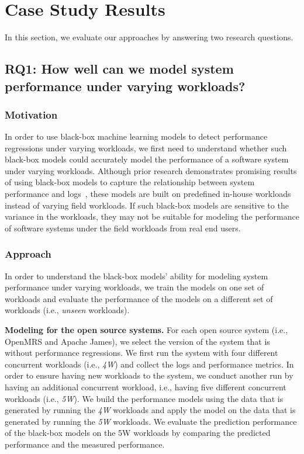 \section{Case Study Results} \label{sec:casestudyresults}
In this section, we evaluate our approaches by answering two research questions.

\subsection*{RQ1: How well can we model system performance under varying workloads?}

\subsubsection*{Motivation}
In order to use black-box machine learning models to detect performance regressions under varying workloads, we first need to understand whether such black-box models could accurately model the performance of a software system under varying workloads.
Although prior research demonstrates promising results of using black-box models to capture the relationship between system performance and logs~\citep{Yao:2018:LSL:3184407.3184416,DBLP:conf/issre/FarshchiSWG15},
these models are built on predefined in-house workloads instead of varying field workloads. 
If such black-box models are sensitive to the variance in the workloads, they may not be suitable for modeling the performance of software systems under the field workloads from real end users.

\subsubsection*{Approach}
In order to understand the black-box models' ability for modeling system performance under varying workloads, we train the models on one set of workloads and evaluate the performance of the models on a different set of workloads (i.e., \emph{unseen} workloads).

\noindent\textbf{Modeling for the open source systems. }
For each open source system (i.e., OpenMRS and Apache James), we select the version of the system that is without performance regressions. We first run the system with four different concurrent workloads (i.e., \emph{4W}) and collect the logs and performance metrics. In order to ensure having new workloads to the system, we conduct another run by having an additional concurrent workload, i.e., having five different concurrent workloads (i.e., \emph{5W}). We build the performance models using the data that is generated by running the \emph{4W} workloads and apply the model on the data that is generated by running the \emph{5W} workloads. 
We evaluate the prediction performance of the black-box models on the 5W workloads by comparing the predicted performance and the measured performance.

